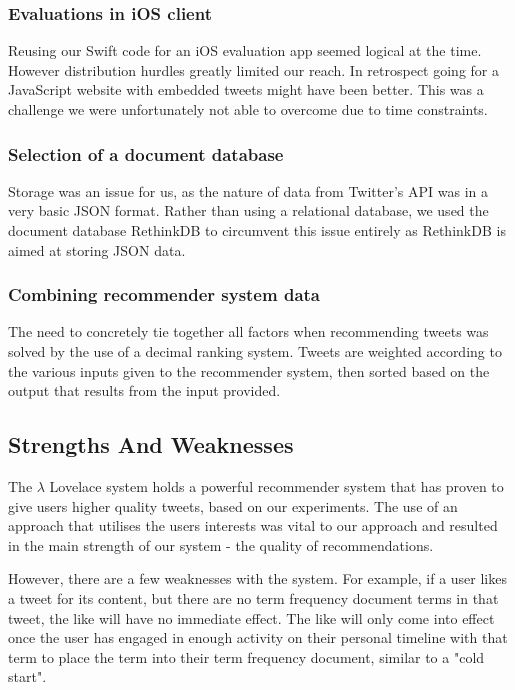 \documentclass{article}
\begin{document}
\subsubsection*{Evaluations in iOS client} 
Reusing our Swift code for an iOS evaluation app seemed logical at the time. However distribution hurdles greatly limited our reach. In retrospect going for a JavaScript website with embedded tweets \cite{embed-tweet} might have been better. This was a challenge we were unfortunately not able to overcome due to time constraints.

\subsubsection*{Selection of a document database} 
Storage was an issue for us, as the nature of data from Twitter's API was in a very basic JSON format. Rather than using a relational database, we used the document database RethinkDB to circumvent this issue entirely as RethinkDB is aimed at storing JSON data.

\subsubsection*{Combining recommender system data} 
The need to concretely tie together all factors when recommending tweets was solved by the use of a decimal ranking system. Tweets are weighted according to the various inputs given to the recommender system, then sorted based on the output that results from the input provided.




\subsection{Strengths And Weaknesses} 
The $\lambda$ Lovelace system holds a powerful recommender system that has proven to give users higher quality tweets, based on our experiments. The use of an approach that utilises the users interests was vital to our approach and resulted in the main strength of our system - the quality of recommendations.

However, there are a few weaknesses with the system. For example, if a user likes a tweet for its content, but there are no term frequency document terms in that tweet, the like will have no immediate effect. The like will only come into effect once the user has engaged in enough activity on their personal timeline with that term to place the term into their term frequency document, similar to a "cold start". 
\end{document}
